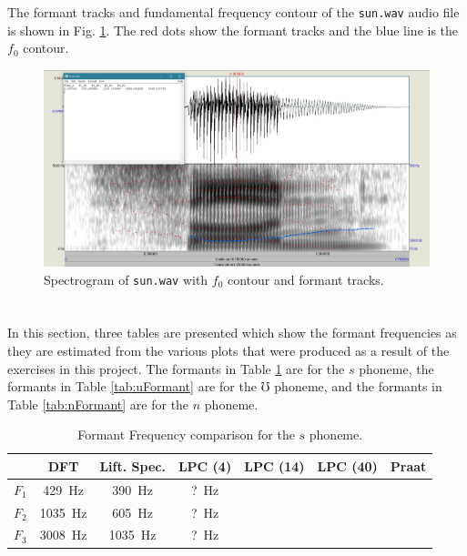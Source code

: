 \documentclass[letterpaper]{article}
\begin{document}
\newpage


\section{}
The formant tracks and fundamental frequency contour of the \texttt{sun.wav} audio file is shown in Fig. \ref{praat}. The red dots show the formant tracks and the blue line is the $f_0$ contour.
\begin{figure}[h!]
\centering
\includegraphics[width=\textwidth]{part9praat}
\caption{Spectrogram of \texttt{sun.wav} with $f_0$ contour and formant tracks.}
\label{praat}
\end{figure}


\newpage
\section{}
In this section, three tables are presented which show the formant frequencies as they are estimated from the various plots that were produced as a result of the exercises in this project. The formants in Table \ref{tab:sFormant} are for the $s$ phoneme, the formants in Table \ref{tab:uFormant} are for the $\mho$ phoneme, and the formants in Table \ref{tab:nFormant} are for the $n$ phoneme.


\begin{table}[h]
    \centering
    \begin{tabular}{c||c|c|c|c|c||c}
          & DFT & Lift. Spec. & LPC (4) & LPC (14) & LPC (40) & Praat \\
    \hline
    \hline
    $F_1$ & 429~Hz &    390~Hz   &  ?~Hz   &     &    &    \\
    $F_2$ & 1035~Hz &   605~Hz   &  ?~Hz   &     &    &    \\
    $F_3$ & 3008~Hz &   1035~Hz  &  ?~Hz   &     &    &    \\
    \end{tabular}
    \caption{Formant Frequency comparison for the $s$ phoneme.}
    \label{tab:sFormant}
\end{table}
\end{document}
